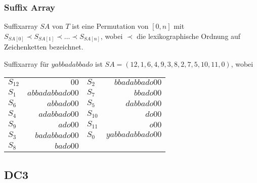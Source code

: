 \documentclass{beamer}
\begin{document}
\begin{frame}[fragile]
\frametitle{Suffix Array}
\begin{definition}
Suffixarray $SA$ von $T$ ist eine Permutation von $[0,n]$ mit $S_{SA[0]} \prec S_{SA[1]} \prec \dots \prec S_{SA[n]}$, wobei $\prec$ die lexikographische Ordnung auf Zeichenketten bezeichnet.
\end{definition}
\begin{example}
Suffixarray für $yabbadabbado$ ist $SA = (12, 1, 6, 4, 9, 3, 8, 2, 7, 5, 10, 11, 0)$, wobei
\begin{table}
\begin{tabular}{l r|l r}
    \toprule
    $S_{12}$    & $00$                          & $S_2$     & $b b a d a b b a d o 0 0$     \\
    $S_1$       & $a b b a d a b b a d o 0 0$   & $S_7$     & $b b a d o 0 0$               \\
    $S_6$       & $a b b a d o 0 0$             & $S_5$     & $d a b b a d o 0 0$           \\
    $S_4$       & $a d a b b a d o 0 0$         & $S_{10}$  & $d o 0 0$                     \\
    $S_9$       & $a d o 0 0$                   & $S_{11}$  & $o 0 0$                       \\
    $S_3$       & $b a d a b b a d o 0 0$       & $S_0$     & $y a b b a d a b b a d o 0 0$ \\
    $S_8$       & $b a d o 0 0$                 &           &                               \\
    \bottomrule
\end{tabular}
\end{table}
\end{example}
\end{frame}

\subsection{DC3}
\end{document}
